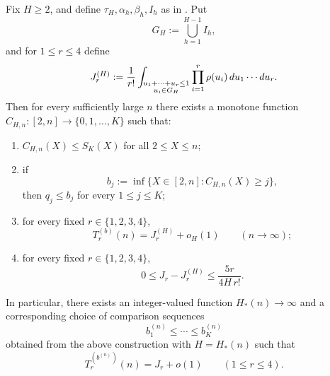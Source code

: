 \begin{proposition}\label{prop:envelope-inversion}
Fix $H\ge 2$, and define $\tau_H,\alpha_h,\beta_h,I_h$ as in
.  Put
\[
  G_H := \bigcup_{h=1}^{H-1} I_h,
\]
and for $1\le r\le 4$ define
\[
  J_r^{(H)}
  :=
  \frac1{r!}
  \int_{\substack{u_1+\cdots+u_r\le 1\\u_i\in G_H}}
  \prod_{i=1}^r \rho(u_i)\,du_1\cdots du_r.
\]
Then for every sufficiently large $n$ there exists a monotone function
$C_{H,n}:[2,n]\to\{0,1,\dots,K\}$ such that:
\begin{enumerate}
  \item $C_{H,n}(X)\le S_K(X)$ for all $2\le X\le n$;
  \item if
    \[
      b_j := \inf\{X\in[2,n]: C_{H,n}(X)\ge j\},
    \]
    then $q_j \le b_j$ for every $1\le j\le K$;
  \item for every fixed $r\in\{1,2,3,4\}$,
    \[
      T_r^{(b)}(n)=J_r^{(H)}+o_H(1)
      \qquad (n\to\infty);
    \]
  \item for every fixed $r\in\{1,2,3,4\}$,
    \[
      0\le J_r-J_r^{(H)}\le \frac{5r}{4H\,r!}.
    \]
\end{enumerate}
In particular, there exists an integer-valued function $H_*(n)\to\infty$ and a
corresponding choice of comparison sequences
\[
  b_1^{(n)}\le \cdots \le b_K^{(n)}
\]
obtained from the above construction with $H=H_*(n)$ such that
\[
  T_r^{(b^{(n)})}(n)=J_r+o(1)
  \qquad (1\le r\le 4).
\]
\end{proposition}


